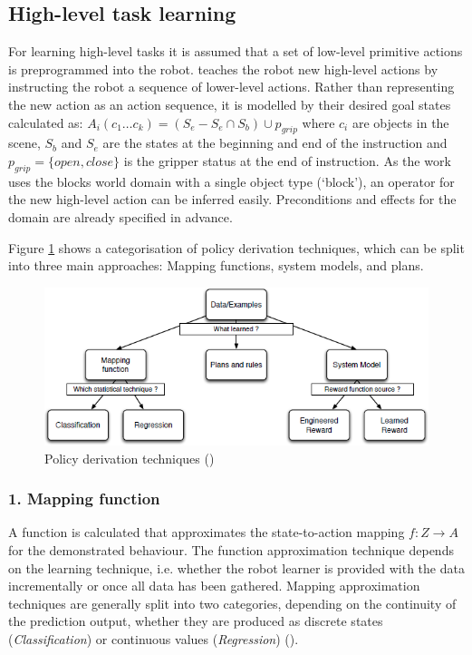 \subsection{High-level task learning}
For learning high-level tasks it is assumed that a set of low-level primitive actions is preprogrammed into the robot. 
\cite{she2014teaching} teaches the robot new high-level actions by instructing the robot a sequence of lower-level actions.
Rather than representing the new action as an action sequence, it is modelled by their desired goal states calculated as:
$A_i(c_1 \dots c_k) = (S_e - S_e \cap S_b) \cup p_{grip}$ where $c_i$ are objects in the scene, $S_b$ and $S_e$ are the states at the beginning and end of the instruction and $p_{grip} = \{open, close\}$ is the gripper status at the end of instruction.
As the work uses the blocks world domain with a single object type (`block'), an operator for the new high-level action can be inferred easily. Preconditions and effects for the domain are already specified in advance.

Figure \ref{fig:Learning-techniques} shows a categorisation of policy derivation techniques, which can be split into three main approaches: Mapping functions, system models, and plans.

\begin{figure}[!h]
	\centering
	\includegraphics[scale=0.75]{figures/Learning-techniques}
	\caption{Policy derivation techniques (\cite{argall2009survey})}
	\label{fig:Learning-techniques}
\end{figure}


\subsubsection{1. Mapping function} 
A function is calculated that approximates the state-to-action mapping $f : Z \rightarrow A$ for the demonstrated behaviour. The function approximation technique depends on the learning technique, i.e. whether the robot learner is provided with the data incrementally or once all data has been gathered. Mapping approximation techniques are generally split into two categories, depending on the continuity of the prediction output, whether they are produced as discrete states (\textit{Classification}) or continuous values (\textit{Regression}) (\cite{argall2009survey}).

